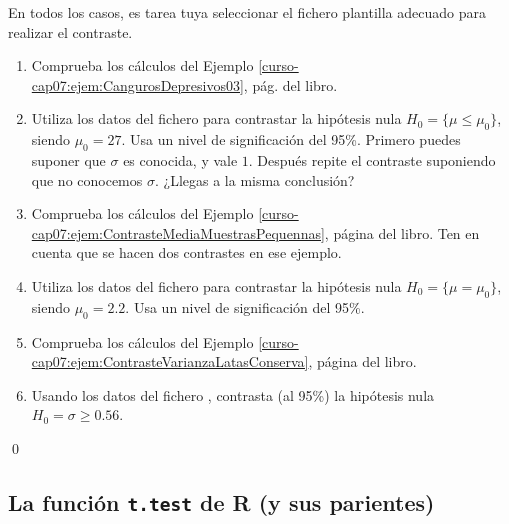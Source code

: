 \documentclass[10pt,a4paper]{article}\usepackage[]{graphicx}\usepackage[]{color}
\newcounter {cont01}
\begin{document}
\begin{ejercicio}
\label{tut07:ejercicio11}
\label{tut07:subsubsec:EjerciciosContrasteHipotesis}
En todos los casos, es tarea tuya seleccionar el fichero plantilla adecuado para realizar el contraste.
\begin{enumerate}

    \item Comprueba los cálculos del Ejemplo \ref{curso-cap07:ejem:CangurosDepresivos03}, pág. \pageref{curso-cap07:ejem:CangurosDepresivos03} del libro.

    \item Utiliza los datos del fichero  para contrastar la hipótesis nula $H_0=\{\mu\leq \mu_0\}$, siendo $\mu_0=27$. Usa un nivel de significación del 95\%. Primero puedes suponer que $\sigma$ es conocida, y vale $1$. Después repite el contraste suponiendo que no conocemos $\sigma$. ¿Llegas a la misma conclusión?

    \item Comprueba los cálculos del Ejemplo \ref{curso-cap07:ejem:ContrasteMediaMuestrasPequennas}, página \pageref{curso-cap07:ejem:ContrasteMediaMuestrasPequennas} del libro. Ten en cuenta que se hacen dos contrastes en ese ejemplo.

    \item Utiliza los datos del fichero  para contrastar la hipótesis nula $H_0=\{\mu=\mu_0\}$, siendo $\mu_0=2.2$. Usa un nivel de significación del 95\%.

    \item Comprueba los cálculos del Ejemplo \ref{curso-cap07:ejem:ContrasteVarianzaLatasConserva},
      página \pageref{curso-cap07:ejem:ContrasteVarianzaLatasConserva} del libro.

    \item Usando los datos del fichero , contrasta (al 95\%) la hipótesis nula $H_0={\sigma\geq 0.56}$.
\end{enumerate}
\qed
\end{ejercicio}

\subsection{La función {\tt t.test} de R (y sus parientes)}
\end{document}
